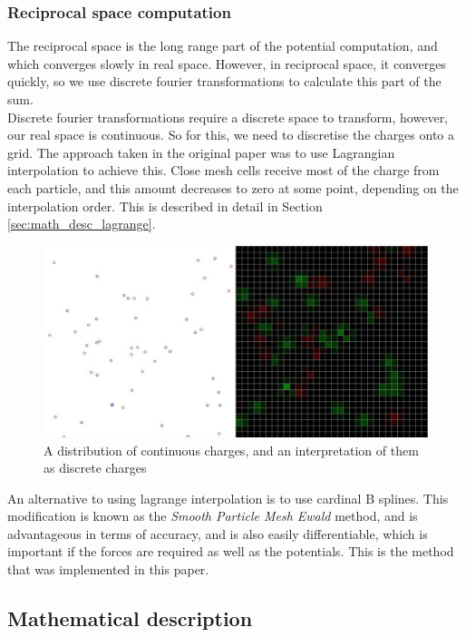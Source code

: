 \documentclass[pdftex,twoside,a4paper]{report}
\newcommand{\bcen}{\begin{center}}
\newcommand{\ecen}{\end{center}}
\begin{document}
\subsubsection{Reciprocal space computation}
The reciprocal space is the long range part of the potential computation, and which converges slowly in real space. However, in reciprocal space, it converges quickly, so we use discrete fourier transformations to calculate this part of the sum.\\

Discrete fourier transformations require a discrete space to transform, however, our real space is continuous. So for this, we need to discretise the charges onto a grid. The approach taken in the original paper was to use Lagrangian interpolation to achieve this. Close mesh cells receive most of the charge from each particle, and this amount decreases to zero at some point, depending on the interpolation order. This is described in detail in Section \ref{sec:math_desc_lagrange}.\\
\begin{figure}[h]
\bcen \includegraphics[width=\textwidth]{figures/Qarray.jpg} \ecen
\caption{A distribution of continuous charges, and an interpretation of them as discrete charges}
\end{figure}

An alternative to using lagrange interpolation is to use cardinal B splines. This modification is known as the \emph{Smooth Particle Mesh Ewald} method, and is advantageous in terms of accuracy, and is also easily differentiable, which is important if the forces are required as well as the potentials.  \cite{essmann:8577} This is the method that was implemented in this paper.

\subsection{Mathematical description}
\end{document}
